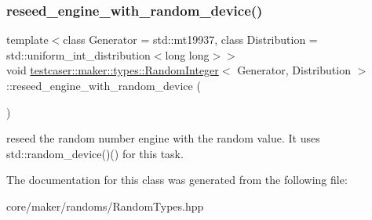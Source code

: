 \subsubsection{\texorpdfstring{reseed\_engine\_with\_random\_device()}{reseed\_engine\_with\_random\_device()}}
{\footnotesize\ttfamily template$<$class Generator = std\+::mt19937, class Distribution = std\+::uniform\+\_\+int\+\_\+distribution$<$long long$>$$>$ \\
void \mbox{\hyperlink{classtestcaser_1_1maker_1_1types_1_1RandomInteger}{testcaser\+::maker\+::types\+::\+Random\+Integer}}$<$ Generator, Distribution $>$\+::reseed\+\_\+engine\+\_\+with\+\_\+random\+\_\+device (\begin{DoxyParamCaption}{ }\end{DoxyParamCaption})\hspace{0.3cm}{\ttfamily [inline]}}



reseed the random number engine with the random value. It uses std\+::random\+\_\+device()() for this task. 



The documentation for this class was generated from the following file\+:\begin{DoxyCompactItemize}
\item 
core/maker/randoms/Random\+Types.\+hpp\end{DoxyCompactItemize}
